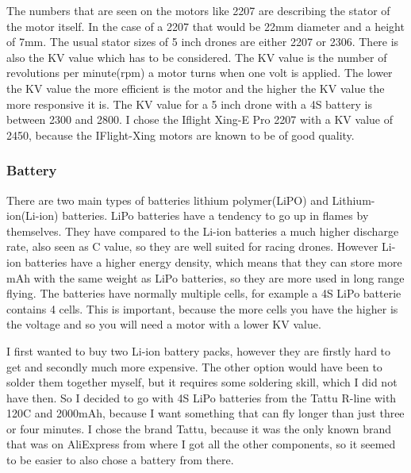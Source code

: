 \documentclass{article}
\begin{document}
	The numbers that are seen on the motors like 2207 are describing the stator of the motor itself. In the case of a 2207 that would be 22mm diameter and a height of 7mm. The usual stator sizes of 5 inch drones are either 2207 or 2306. There is also the KV value which has to be considered. The KV value is the number of revolutions per minute(rpm) a motor turns when one volt is applied. The lower the KV value the more efficient is the motor and the higher the KV value the more responsive it is. The KV value for a 5 inch drone with a 4S battery is between 2300 and 2800. I chose the Iflight Xing-E Pro 2207\cite{xingepro} with a KV value of 2450, because the IFlight-Xing motors are known to be of good quality. 
	
	\subsubsection{Battery}
	There are two main types of batteries lithium polymer(LiPO) and Lithium-ion(Li-ion) batteries. LiPo batteries have a tendency to go up in flames by themselves. They have compared to the Li-ion batteries a much higher discharge rate, also seen as C value, so they are well suited for racing drones. However Li-ion batteries have a higher energy density, which means that they can store more mAh with the same weight as LiPo batteries, so they are more used in long range flying. The batteries have normally multiple cells, for example a 4S LiPo batterie contains 4 cells. This is important, because the more cells you have the higher is the voltage and so you will need a motor with a lower KV value. 
	
	I first wanted to buy two Li-ion battery packs, however they are firstly hard to get and secondly much more expensive. The other option would have been to solder them together myself, but it requires some soldering skill, which I did not have then. So I decided to go with 4S LiPo batteries from the Tattu R-line with 120C and 2000mAh\cite{tattu}, because I want something that can fly longer than just three or four minutes. I chose the brand Tattu, because it was the only known brand that was on AliExpress from where I got all the other components, so it seemed to be easier to also chose a battery from there. 
	
\end{document}
